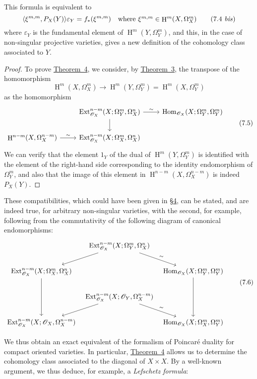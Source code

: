 \documentclass{article}
\theoremstyle{plain}
\theoremstyle{definition}
\newcommand{\scr}[1]{{\mathscr{#1}}}
\DeclareMathOperator{\Ext}{Ext}
\DeclareMathOperator{\Hom}{Hom}
\DeclareMathOperator{\HH}{H}
\newcommand{\oldpage}[1]{\marginpar{\footnotesize$\Big\vert$ \textit{p.~#1}}}
\begin{document}
This formula is equivalent to
\[
\label{7.4bis}
  \langle \xi^{m,m}, P_X(Y) \rangle \varepsilon_Y
  = f_*(\xi^{m,m})
  \quad\mbox{where $\xi^{m,m}\in\HH^m(X,\Omega_X^m)$}
\tag{7.4~\emph{bis}}
\]
where $\varepsilon_Y$ is the fundamental element of $\HH^m(Y,\Omega_Y^m)$, and this, in the case of non-singular projective varieties, gives a new definition of the cohomology class associated to $Y$.

\begin{proof}
  To prove \hyperref[theorem4]{Theorem~4}, we consider, by \hyperref[theorem3]{Theorem~3}, the transpose of the homomorphism
  \[
    \HH^m(X,\Omega_X^m) \to \HH^m(Y,\Omega_Y^m) = \HH^m(X,\Omega_Y^m)
  \]
  as the homomorphism
  \[
  \label{7.5}
    \begin{tikzcd}
      &\Ext_{\scr{O}_X}^{n-m}(X;\Omega_Y^m,\Omega_X^n)
        \rar["\sim"] \dar
      &\Hom_{\scr{O}_X}(X;\Omega_Y^m,\Omega_Y^m)
    \\
      \HH^{n-m}(X,\Omega_X^{n-m})
        \rar["\sim"]
      &\Ext_{\scr{O}_X}^{n-m}(X;\Omega_X^m,\Omega_X^n)
      &
    \end{tikzcd}
  \tag{7.5}
  \]
  We can verify that the element $1_Y$ of the dual of $\HH^m(Y,\Omega_Y^m)$ is identified with the element of the right-hand side corresponding to the identity endomorphism of $\Omega_Y^m$, and also that the image of this element in $\HH^{n-m}(X,\Omega_X^{n-m})$ is indeed $P_X(Y)$.
\end{proof}

These compatibilities, which could have been given in \hyperref[section4]{\S4}, can be stated, and are indeed true, for arbitrary non-singular varieties, with the second,
\oldpage{149-21}
for example, following from the commutativity of the following diagram of canonical endomorphisms:
\[
\label{7.6}
  \begin{tikzcd}[column sep=tiny]
    & \Ext_{\scr{O}_X}^{n-m}(X;\Omega_Y^m,\Omega_X^n)
      \ar[ld] \ar[dr,"\sim"]
    &
  \\\Ext_{\scr{O}_X}^{n-m}(X;\Omega_X^m,\Omega_X^n)
      \ar[dd]
    && \Hom_{\scr{O}_X}(X;\Omega_Y^m,\Omega_Y^m)
      \ar[dd]
  \\& \Ext_{\scr{O}_X}^{n-m}(X;\scr{O}_Y,\Omega_X^{n-m})
      \ar[ld] \ar[dr,"\sim"]
    &
  \\\Ext_{\scr{O}_X}^{n-m}(X;\scr{O}_X,\Omega_X^{n-m})
    && \Hom_{\scr{O}_X}(X;\Omega_X^m,\Omega_Y^m)
  \end{tikzcd}
\tag{7.6}
\]

We thus obtain an exact equivalent of the formalism of Poincar\'{e} duality for compact oriented varieties.
In particular, \hyperref[theorem4]{Theorem~4} allows us to determine the cohomology class associated to the diagonal of $X\times X$.
By a well-known argument, we thus deduce, for example, a \emph{Lefschetz formula}:
\end{document}
